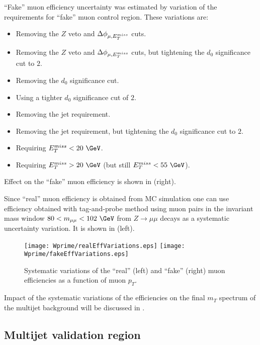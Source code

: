 ``Fake'' muon efficiency uncertainty was estimated by variation of the requirements for ``fake'' muon control region. These variations are:
\begin{itemize}
\item Removing the $Z$ veto and $\Delta\phi_{\mu,E_T^{miss}}$ cuts.
\item Removing the $Z$ veto and $\Delta\phi_{\mu,E_T^{miss}}$ cuts, but tightening the $d_0$ significance
cut to $2$.
\item Removing the $d_0$ significance cut. 
\item Using a tighter $d_0$ significance cut of $2$.
\item Removing the jet requirement.
\item Removing the jet requirement, but tightening the $d_0$ significance
cut to $2$.
\item Requiring $\met < 20~\GeV$.
\item Requiring $\met > 20~\GeV$ (but still $\met < 55~\GeV$).
\end{itemize}
Effect on the ``fake'' muon efficiency is shown in  (right).

Since ``real'' muon efficiency is obtained from MC simulation one can use efficiency obtained with tag-and-probe method using muon pairs in the invariant mass window $80 < m_{\mu\mu} < 102~\GeV$ from $Z\to\mu\mu$ decays as a systematic uncertainty variation. It is shown in  (left).

\begin{figure}[]
  \centering
  \texttt{[image: Wprime/realEffVariations.eps]}
  \texttt{[image: Wprime/fakeEffVariations.eps]}
  \caption{Systematic variations of the ``real'' (left) and ``fake'' (right) muon efficiencies as a function of muon $p_T$.}
  \label{fig:matrix_method_systematics}
\end{figure}

Impact of the systematic variations of the efficiencies on the final $m_T$ spectrum of the multijet background will be discussed in .


\subsection{Multijet validation region}


